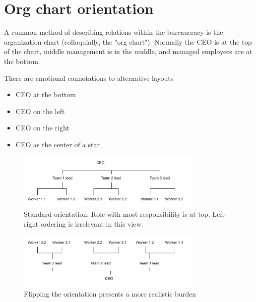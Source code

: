 \section{Org chart orientation
\label{org-chart-orientation}}
A common method of describing relations within the bureaucracy is the organization chart (colloquially, the "org chart"). Normally the CEO is at the top of the chart, middle management is in the middle, and managed employees are at the bottom. 

There are emotional connotations to alternative layouts
\begin{itemize}
\item CEO at the bottom
\item CEO on the left
\item CEO on the right
\item CEO as the center of a star
\end{itemize}


\begin{figure}
\includegraphics[width=0.8\textwidth]{images/org-chart-orientation-ceo-at-top.pdf}
\caption{Standard orientation. Role with most responsibility is at top. Left-right ordering is irrelevant in this view.}
\end{figure}

\begin{figure}
\includegraphics[width=0.8\textwidth]{images/org-chart-orientation-ceo-at-bottom.pdf}
\caption{Flipping the orientation presents a more realistic burden}
\end{figure}


